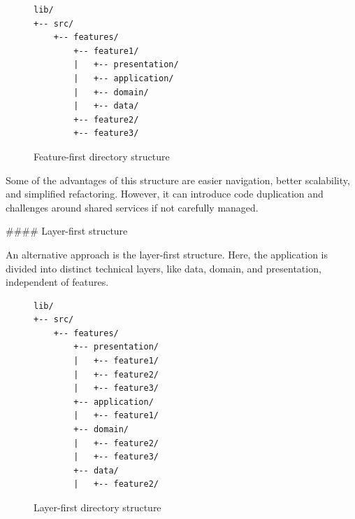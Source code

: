 \documentclass[
  digital,     %
  oneside,     %
  nosansbold,  %
  nocolorbold, %
  lof,         %
  lot,         %
]{fithesis4}
\begin{document}
\begin{figure}[ht]
  \begin{center}
    \begin{minipage}{.8\textwidth}
      \begin{verbatim}
lib/
+-- src/
    +-- features/
        +-- feature1/
        |   +-- presentation/
        |   +-- application/
        |   +-- domain/
        |   +-- data/
        +-- feature2/
        +-- feature3/
      \end{verbatim}
    \end{minipage}
  \end{center}
  \caption{Feature-first directory structure}
  \label{fig:project_directory_feature_first}
\end{figure}

\begin{markdown}

Some of the advantages of this structure are easier navigation, better scalability, and simplified refactoring.  
However, it can introduce code duplication and challenges around shared services if not carefully managed.

#### Layer-first structure

An alternative approach is the layer-first structure. Here, the application is divided into distinct technical layers, like data, domain, and presentation, independent of features.


\end{markdown}
\begin{figure}[ht]
  \begin{center}
    \begin{minipage}{.8\textwidth}
      \begin{verbatim}
lib/
+-- src/
    +-- features/
        +-- presentation/
        |   +-- feature1/
        |   +-- feature2/
        |   +-- feature3/
        +-- application/
        |   +-- feature1/
        +-- domain/
        |   +-- feature2/
        |   +-- feature3/
        +-- data/
        |   +-- feature2/
      \end{verbatim}
    \end{minipage}
  \end{center}
  \caption{Layer-first directory structure}
  \label{fig:project_directory_layer_first}
\end{figure}
\end{document}
